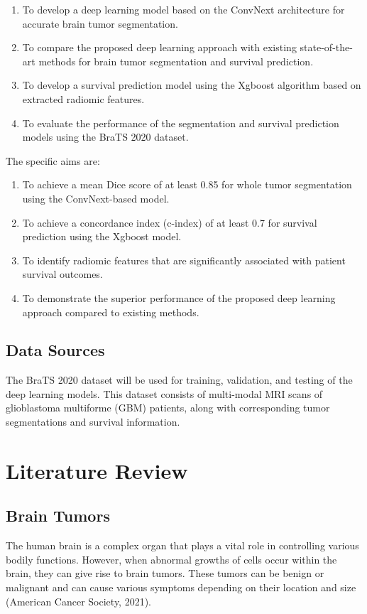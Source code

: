 \documentclass[12pt,oneside]{report}
\begin{document}
\begin{enumerate}
\item To develop a deep learning model based on the ConvNext architecture for accurate brain tumor segmentation.

\item To compare the proposed deep learning approach with existing state-of-the-art methods for brain tumor segmentation and survival prediction.

\item To develop a survival prediction model using the Xgboost algorithm based on extracted radiomic features.

\item To evaluate the performance of the segmentation and survival prediction models using the BraTS 2020 dataset.

\end{enumerate}

The specific aims are:
\begin{enumerate}
\item To achieve a mean Dice score of at least 0.85 for whole tumor segmentation using the ConvNext-based model.

\item To achieve a concordance index (c-index) of at least 0.7 for survival prediction using the Xgboost model.

\item To identify radiomic features that are significantly associated with patient survival outcomes.

\item To demonstrate the superior performance of the proposed deep learning approach compared to existing methods.

\end{enumerate}

\section{Data Sources}
The BraTS 2020 dataset will be used for training, validation, and testing of the deep learning models. This dataset consists of multi-modal MRI scans of glioblastoma multiforme (GBM) patients, along with corresponding tumor segmentations and survival information.


\chapter{Literature Review}
\section{Brain Tumors}
The human brain is a complex organ that plays a vital role in controlling various bodily functions. 
However, when abnormal growths of cells occur within the brain, they can give rise to brain tumors. 
These tumors can be benign or malignant and can cause various symptoms depending on their location 
and size (American Cancer Society, 2021). 
\end{document}
